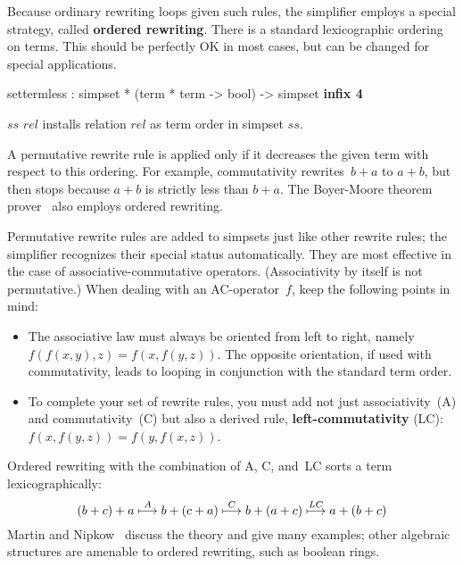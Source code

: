 Because ordinary rewriting loops given such rules, the simplifier
employs a special strategy, called {\bf ordered
  rewriting}.  There is a standard
lexicographic ordering on terms.  This should be perfectly OK in most
cases, but can be changed for special applications.

\begin{ttbox}
settermless : simpset * (term * term -> bool) -> simpset \hfill{\bf infix 4}
\end{ttbox}
\begin{ttdescription}
  
\item[$ss$ \ttindexbold{settermless} $rel$] installs relation $rel$ as
  term order in simpset $ss$.

\end{ttdescription}

\medskip

A permutative rewrite rule is applied only if it decreases the given
term with respect to this ordering.  For example, commutativity
rewrites~$b+a$ to $a+b$, but then stops because $a+b$ is strictly less
than $b+a$.  The Boyer-Moore theorem prover~\cite{bm88book} also
employs ordered rewriting.

Permutative rewrite rules are added to simpsets just like other
rewrite rules; the simplifier recognizes their special status
automatically.  They are most effective in the case of
associative-commutative operators.  (Associativity by itself is not
permutative.)  When dealing with an AC-operator~$f$, keep the
following points in mind:
\begin{itemize}
  
\item The associative law must always be oriented from left to right,
  namely $f(f(x,y),z) = f(x,f(y,z))$.  The opposite orientation, if
  used with commutativity, leads to looping in conjunction with the
  standard term order.

\item To complete your set of rewrite rules, you must add not just
  associativity~(A) and commutativity~(C) but also a derived rule, {\bf
    left-com\-mut\-ativ\-ity} (LC): $f(x,f(y,z)) = f(y,f(x,z))$.
\end{itemize}
Ordered rewriting with the combination of A, C, and~LC sorts a term
lexicographically:
\[\def\maps#1{\stackrel{#1}{\longmapsto}}
 (b+c)+a \maps{A} b+(c+a) \maps{C} b+(a+c) \maps{LC} a+(b+c) \]
Martin and Nipkow~\cite{martin-nipkow} discuss the theory and give many
examples; other algebraic structures are amenable to ordered rewriting,
such as boolean rings.

